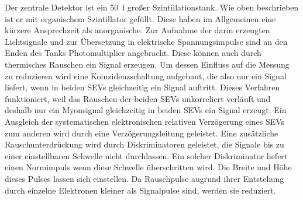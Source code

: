 Der zentrale Detektor ist ein \SI{50}{\litre} großer Szintillationstank. Wie oben beschrieben ist er mit organischem Szintillator gefüllt. Diese haben im Allgemeinen eine kürzere Ansprechzeit als anorganische. Zur Aufnahme der darin erzeugten Lichtsignale und zur Übersetzung in elektrische Spannungsimpulse sind an den Enden des Tanks Photomultiplier angebracht. Diese können auch durch thermisches Rauschen ein Signal erzeugen. Um dessen Einfluss auf die Messung zu reduzieren wird eine Koinzidenzschaltung aufgebaut, die also nur ein Signal liefert, wenn in beiden SEVs gleichzeitig ein Signal auftritt. Dieses Verfahren funktioniert, weil das Rauschen der beiden SEVs unkorreliert verläuft und deshalb nur ein Myonsignal gleichzeitig in beiden SEVs ein Signal erzeugt. Ein Ausgleich der systematischen elektronischen relativen Verzögerung eines SEVs zum anderen wird durch eine Verzögerungsleitung geleistet. Eine zusätzliche Rauschunterdrückung wird durch Diskriminatoren geleistet, die Signale bis zu einer einstellbaren Schwelle nicht durchlassen. Ein solcher Diskriminator liefert einen Normimpuls wenn diese Schwelle überschritten wird. Die Breite und Höhe dieses Pulses lassen sich einstellen.
Da Rauschpulse augrund ihrer Entstehung durch einzelne Elektronen kleiner als Signalpulse sind, werden sie reduziert.

